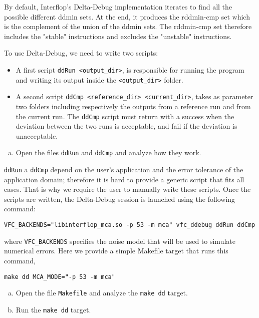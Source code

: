 By default, Interflop's Delta-Debug implementation iterates to find all the
possible different ddmin sets. At the end, it produces the rddmin-cmp set which
is the complement of the union of the ddmin sets. The rddmin-cmp set therefore
includes the "stable" instructions and excludes the "unstable" instructions.

To use Delta-Debug, we need to write two scripts: \begin{itemize}
  \item A first script \texttt{ddRun <output\_dir>}, is responsible for running the program and writing its output inside the \texttt{<output\_dir>} folder.
  \item A second script \texttt{ddCmp <reference\_dir> <current\_dir>}, takes as parameter two folders including respectively the outputs from a reference run and from the current run. The \texttt{ddCmp} script must return with a success when the deviation between the two runs is acceptable, and fail if the deviation is unacceptable.
\end{itemize}

\begin{question}
  \begin{enumerate}[(a)]
    \item Open the files \texttt{ddRun} and \texttt{ddCmp} and analyze how they work.
  \end{enumerate}
\end{question}

\texttt{ddRun} a \texttt{ddCmp} depend on the user's application and the error tolerance
of the application domain; therefore it is hard to provide a generic script that fits all cases. That is why we require the user to manually write these scripts. 
Once the scripts are written, the Delta-Debug session is launched using the following command:

\begin{verbatim}
VFC_BACKENDS="libinterflop_mca.so -p 53 -m mca" vfc_ddebug ddRun ddCmp
\end{verbatim}

where \texttt{VFC\_BACKENDS} specifies the noise model that will be used to
simulate numerical errors. Here we provide a simple Makefile target that
runs this command,
\begin{verbatim}
make dd MCA_MODE="-p 53 -m mca"
\end{verbatim}

\begin{question}
  \begin{enumerate}[(a)]
    \item Open the file \texttt{Makefile} and analyze the \texttt{make dd} target.
    \item Run the \texttt{make dd} target.
  \end{enumerate}
\end{question}

